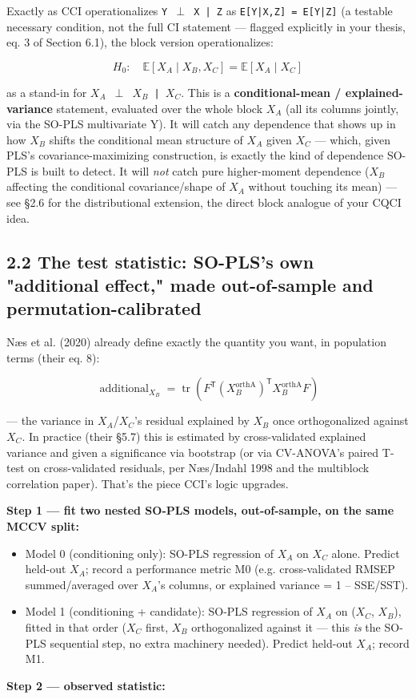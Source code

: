 \documentclass[11pt,a4paper]{article}
\begin{document}
	Exactly as CCI operationalizes \texttt{Y \(\perp\) X | Z} as \texttt{E[Y|X,Z] = E[Y|Z]} (a testable necessary condition, not the full CI statement — flagged explicitly in your thesis, eq. 3 of Section 6.1), the block version operationalizes:
	
	\[
	H_0:\quad \mathbb{E}[X_A\mid X_B,X_C]=\mathbb{E}[X_A\mid X_C]
	\]
	
	as a stand-in for \texttt{\(X_A\) \(\perp\) \(X_B\) | \(X_C\)}. This is a \textbf{conditional-mean / explained-variance} statement, evaluated over the whole block \(X_A\) (all its columns jointly, via the SO-PLS multivariate Y). It will catch any dependence that shows up in how \(X_B\) shifts the conditional mean structure of \(X_A\) given \(X_C\) — which, given PLS's covariance-maximizing construction, is exactly the kind of dependence SO-PLS is built to detect. It will \emph{not} catch pure higher-moment dependence (\(X_B\) affecting the conditional covariance/shape of \(X_A\) without touching its mean) — see \S{}2.6 for the distributional extension, the direct block analogue of your CQCI idea.
	
	\subsection{2.2 The test statistic: SO-PLS's own "additional effect," made out-of-sample and permutation-calibrated}
	
	Næs et al. (2020) already define exactly the quantity you want, in population terms (their eq. 8):
	
	\[
	\operatorname{additional}_{X_B}=\operatorname{tr}\!\left(F^{\mathsf T}(X_B^{\mathrm{orthA}})^{\mathsf T}X_B^{\mathrm{orthA}}F\right)
	\]
	
	— the variance in \(X_A\)/\(X_C\)'s residual explained by \(X_B\) once orthogonalized against \(X_C\). In practice (their \S{}5.7) this is estimated by cross-validated explained variance and given a significance via bootstrap (or via CV-ANOVA's paired T-test on cross-validated residuals, per Næs/Indahl 1998 and the multiblock correlation paper). That's the piece CCI's logic upgrades.
	
	\textbf{Step 1 — fit two nested SO-PLS models, out-of-sample, on the same MCCV split:}
	
	\begin{itemize}
		\item Model 0 (conditioning only): SO-PLS regression of \(X_A\) on \(X_C\) alone. Predict held-out \(X_A\); record a performance metric M0 (e.g. cross-validated RMSEP summed/averaged over \(X_A\)'s columns, or explained variance = 1 -- SSE/SST).
		\item Model 1 (conditioning + candidate): SO-PLS regression of \(X_A\) on (\(X_C\), \(X_B\)), fitted in that order (\(X_C\) first, \(X_B\) orthogonalized against it — this \emph{is} the SO-PLS sequential step, no extra machinery needed). Predict held-out \(X_A\); record M1.
		
	\end{itemize}
	\textbf{Step 2 — observed statistic:}
	
\end{document}
